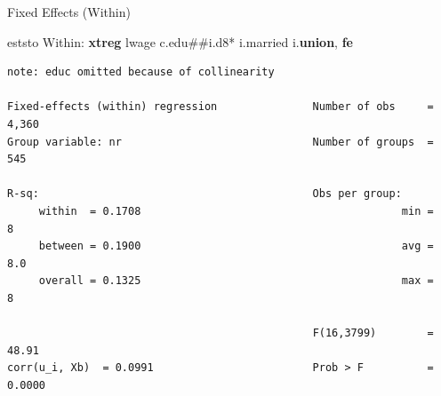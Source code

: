 \documentclass[
]{book}
\newenvironment{Shaded}{\begin{snugshade}}{\end{snugshade}}
\newcommand{\KeywordTok}[1]{\textcolor[rgb]{0.13,0.29,0.53}{\textbf{#1}}}
\newcommand{\NormalTok}[1]{#1}
\begin{document}
Fixed Effects (Within)

\begin{Shaded}
\begin{Highlighting}[]
\NormalTok{eststo Within: }\KeywordTok{xtreg}\NormalTok{ lwage c.edu\#\#i.d8* i.married i.}\KeywordTok{union}\NormalTok{, }\KeywordTok{fe}
\end{Highlighting}
\end{Shaded}

\begin{verbatim}
note: educ omitted because of collinearity

Fixed-effects (within) regression               Number of obs     =      4,360
Group variable: nr                              Number of groups  =        545

R-sq:                                           Obs per group:
     within  = 0.1708                                         min =          8
     between = 0.1900                                         avg =        8.0
     overall = 0.1325                                         max =          8

                                                F(16,3799)        =      48.91
corr(u_i, Xb)  = 0.0991                         Prob > F          =     0.0000


\end{verbatim}
\end{document}
